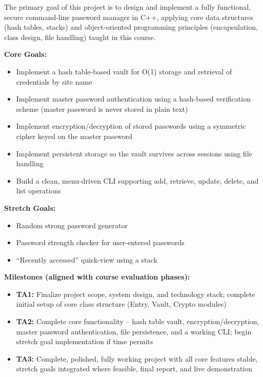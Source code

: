 \documentclass[11pt,a4paper]{article}
\newcommand{\answerbox}[2][]{%
    \vspace{2pt}
    \begin{framed}
    #2
    \end{framed}
}
\begin{document}
\answerbox{The primary goal of this project is to design and implement a fully functional, secure command-line password manager in C++, applying core data structures (hash tables, stacks) and object-oriented programming principles (encapsulation, class design, file handling) taught in this course.

\textbf{Core Goals:}
\begin{itemize}[leftmargin=5mm, itemsep=0pt, topsep=2pt]
\item Implement a hash table-based vault for O(1) storage and retrieval of credentials by site name
\item Implement master password authentication using a hash-based verification scheme (master password is never stored in plain text)
\item Implement encryption/decryption of stored passwords using a symmetric cipher keyed on the master password
\item Implement persistent storage so the vault survives across sessions using file handling
\item Build a clean, menu-driven CLI supporting add, retrieve, update, delete, and list operations
\end{itemize}

\textbf{Stretch Goals:}
\begin{itemize}[leftmargin=5mm, itemsep=0pt, topsep=2pt]
\item Random strong password generator
\item Password strength checker for user-entered passwords
\item ``Recently accessed'' quick-view using a stack
\end{itemize}

\textbf{Milestones (aligned with course evaluation phases):}
\begin{itemize}[leftmargin=5mm, itemsep=0pt, topsep=2pt]
\item \textbf{TA1:} Finalize project scope, system design, and technology stack; complete initial setup of core class structure (Entry, Vault, Crypto modules)
\item \textbf{TA2:} Complete core functionality -- hash table vault, encryption/decryption, master password authentication, file persistence, and a working CLI; begin stretch goal implementation if time permits
\item \textbf{TA3:} Complete, polished, fully working project with all core features stable, stretch goals integrated where feasible, final report, and live demonstration
\end{itemize}}
\end{document}
